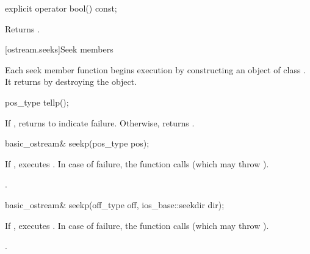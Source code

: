 %
\begin{itemdecl}
explicit operator bool() const;
\end{itemdecl}

\begin{itemdescr}
\pnum
\effects
Returns
.
\end{itemdescr}

[ostream.seeks]{Seek members}

\pnum
Each seek member function begins execution by constructing an object of class .
It returns by destroying the  object.

%
\begin{itemdecl}
pos_type tellp();
\end{itemdecl}

\begin{itemdescr}
\pnum
\returns
If
,
returns
to indicate failure.
Otherwise, returns
.
\end{itemdescr}

%
\begin{itemdecl}
basic_ostream& seekp(pos_type pos);
\end{itemdecl}

\begin{itemdescr}
\pnum
\effects
If
,
executes
.
In case of failure, the function calls
(which may throw
).

\pnum
\returns
{}.
\end{itemdescr}

%
\begin{itemdecl}
basic_ostream& seekp(off_type off, ios_base::seekdir dir);
\end{itemdecl}

\begin{itemdescr}
\pnum
\effects
If
,
executes
.
In case of failure, the function calls 
(which may throw ).

\pnum
\returns
{}.
\end{itemdescr}

